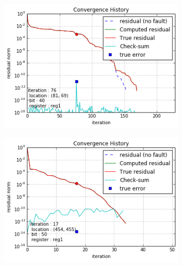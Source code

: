 \begin{figure}[h]
\begin{minipage}[b]{0.48\linewidth}
\begin{subfigure}[t]{\linewidth}
		\caption{}\label{fig:gre_216a_conv_hist_checksum_1}
	\end{subfigure}
    \quad
    \begin{subfigure}[t]{\linewidth}
		\centering
		\includegraphics[width=\linewidth]{figures/gre_216a/convergence_history_checksum_2.png}
		\caption{}\label{fig:gre_216a_conv_hist_checksum_2}
	\end{subfigure}
    \end{minipage}
    \quad
    \begin{minipage}[b]{0.48\linewidth}
    	\begin{subfigure}[t]{\linewidth}
		\centering
		\includegraphics[width=\linewidth]{figures/pores_2/convergence_history_checksum_0.png}
		\caption{}\label{fig:pores_2_conv_hist_checksum_0}		
	\end{subfigure}

\end{minipage}
\end{figure}

